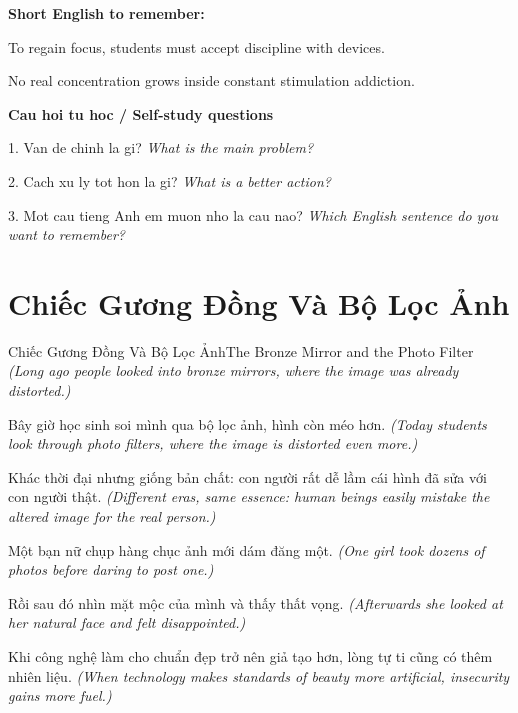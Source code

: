 \begin{ghinhoanh}
\textbf{Short English to remember:}

To regain focus, students must accept discipline with devices.

No real concentration grows inside constant stimulation addiction.

\end{ghinhoanh}

\begin{tuhocnhanh}
\textbf{Cau hoi tu hoc / Self-study questions}

1. Van de chinh la gi? \textit{What is the main problem?}

2. Cach xu ly tot hon la gi? \textit{What is a better action?}

3. Mot cau tieng Anh em muon nho la cau nao? \textit{Which English sentence do you want to remember?}
\end{tuhocnhanh}
\ngancach

\section{Chiếc Gương Đồng Và Bộ Lọc Ảnh}
\begin{truyen}{Chiếc Gương Đồng Và Bộ Lọc Ảnh}{The Bronze Mirror and the Photo Filter}
\textit{(Long ago people looked into bronze mirrors, where the image was already distorted.)}

Bây giờ học sinh soi mình qua bộ lọc ảnh, hình còn méo hơn.
\textit{(Today students look through photo filters, where the image is distorted even more.)}

Khác thời đại nhưng giống bản chất: con người rất dễ lầm cái hình đã sửa với con người thật.
\textit{(Different eras, same essence: human beings easily mistake the altered image for the real person.)}

Một bạn nữ chụp hàng chục ảnh mới dám đăng một.
\textit{(One girl took dozens of photos before daring to post one.)}

Rồi sau đó nhìn mặt mộc của mình và thấy thất vọng.
\textit{(Afterwards she looked at her natural face and felt disappointed.)}

Khi công nghệ làm cho chuẩn đẹp trở nên giả tạo hơn, lòng tự ti cũng có thêm nhiên liệu.
\textit{(When technology makes standards of beauty more artificial, insecurity gains more fuel.)}

\end{truyen}

